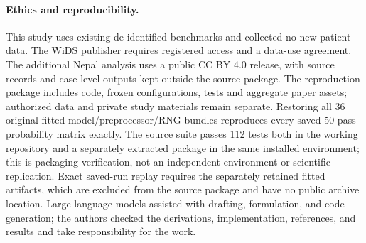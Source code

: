 \documentclass{article}
\begin{document}
\paragraph{Ethics and reproducibility.} This study uses existing de-identified benchmarks and collected no new patient data. The WiDS publisher requires registered access and a data-use agreement. The additional Nepal analysis uses a public CC BY 4.0 release, with source records and case-level outputs kept outside the source package. The reproduction package includes code, frozen configurations, tests and aggregate paper assets; authorized data and private study materials remain separate. Restoring all 36 original fitted model/preprocessor/RNG bundles reproduces every saved 50-pass probability matrix exactly. The source suite passes 112 tests both in the working repository and a separately extracted package in the same installed environment; this is packaging verification, not an independent environment or scientific replication. Exact saved-run replay requires the separately retained fitted artifacts, which are excluded from the source package and have no public archive location. Large language models assisted with drafting, formulation, and code generation; the authors checked the derivations, implementation, references, and results and take responsibility for the work.



\end{document}

